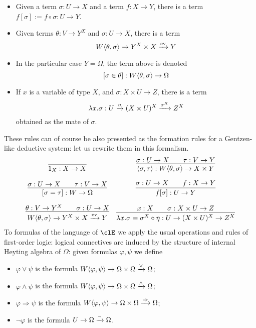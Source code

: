 \begin{definition}
\begin{itemize}
		\item Given a term $\sigma : U \to X$ and a term $f : X \to Y$, there is a term $f[\sigma] := f\circ\sigma : U \to Y$.
		\item Given terms $\theta :  V \to Y^X$ and $\sigma : U\to X$, there is a term
		      \[
			      W\langle \theta,\sigma\rangle \xrightarrow{}Y^X\times X \xrightarrow{\text{ev}} Y
		      \]
		\item In the particular case $Y=\Omega$, the term above is denoted
		      \[[\sigma\in\theta] : W\langle \theta,\sigma\rangle \to \Omega\]
		\item If $x$ is a variable of type $X$, and $\sigma : X\times U \to Z$, there is a term
		      \[\lambda x.\sigma : U \xrightarrow{\eta} (X\times U)^X \xrightarrow{\sigma^X} Z^X\]
		      obtained as the mate of $\sigma$.
	\end{itemize}
	These rules can of course be also presented as the formation rules for a Gentzen-like deductive system: let us rewrite them in this formalism.
	\[ \begin{array}{cc}
			\infer{1_X : X \to X}{}                                                              &
			\infer{\lr{\sigma}{\tau} : W\lr{\theta}{\sigma} \to X \times Y }{\sigma : U \to X    &   & \tau : V \to Y}             \\[1em]
			\infer{[\sigma=\tau] : W \to \Omega}{\sigma : U \to X                                &   & \tau : V \to X}           &
			\infer{f[\sigma] : U \to Y}{\sigma : U \to X                                         &   & f : X \to Y}                \\[1em]
			\infer{W\lr{\theta}{\sigma} \xto{}Y^X\times X \xto{\text{ev}} Y}{\theta :  V \to Y^X &   & \sigma : U\to X}          &
			\infer{\lambda x.\sigma = \sigma^X\circ\eta : U \to (X\times U)^X \to Z^X}{ x: X     &   & \sigma : X\times U \to Z}
		\end{array}\]
	To formulas of the language of $\clE$ we apply the usual operations and rules of first-order logic: logical connectives are induced by the structure of internal Heyting algebra of $\Omega$: given formulas $\varphi,\psi$ we define
	\begin{itemize}
		\item $\varphi\lor \psi$ is the formula $W\langle \varphi,\psi\rangle \to \Omega\times \Omega \xrightarrow{\lor} \Omega$;
		\item $\varphi\land\psi$ is the formula $W\langle \varphi,\psi\rangle \to \Omega\times \Omega \xrightarrow{\land} \Omega$;
		\item $\varphi\Rightarrow\psi$ is the formula $W\langle \varphi,\psi\rangle \to \Omega\times \Omega \xrightarrow{\Rightarrow} \Omega$;
		\item $\lnot\varphi$ is the formula $U \to \Omega \xrightarrow{\lnot} \Omega$.
	\end{itemize}
\end{definition}
